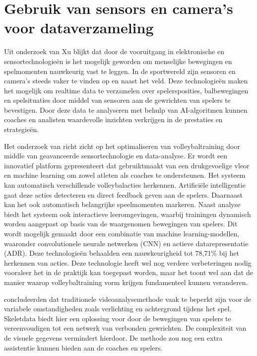 \section{Gebruik van sensors en camera's voor dataverzameling}
Uit onderzoek van Xu \textcite{Sun2021} blijkt dat door de vooruitgang in elektronische en sensortechnologieën is het mogelijk geworden om menselijke bewegingen en spelmomenten nauwkeurig vast te leggen. In de sportwereld zijn sensoren en camera's steeds vaker te vinden op en naast het veld. Deze technologieën maken het mogelijk om realtime data te verzamelen over spelersposities, balbewegingen en spelsituaties door middel van sensoren aan de gewrichten van spelers te bevestigen. Door deze data te analyseren met behulp van AI-algoritmen kunnen coaches en analisten waardevolle inzichten verkrijgen in de prestaties en strategieën.

Het onderzoek van \textcite{Salim2024} richt zicht op het optimaliseren van volleybaltraining door middle van geavanceerde sensortechnologie en data-analyse. Er wordt een innovatief platform gepresenteert dat gebruiktmaakt van een drukgevoelige vleor en machine learning om zowel atleten als coaches te ondersteunen. Het systeem kan automatisch verschillende volleybalacties herkennen. Artificiële intelligentie gaat deze acties detecteren en direct feedback geven aan de spelers. Daarnaast kan het ook automatisch belangrijke speelmomenten markeren.
Naast analyse biedt het systeem ook interactieve leeromgevingen, waarbij trainingen dynamisch worden aangepast op basis van de waargenomen bewegingen van spelers. Dit wordt mogelijk gemaakt door een combinatie van machine learning-modellen, waaronder convolutionele neurale netwerken (CNN) en actieve datarepresentatie (ADR). Deze technologieën behaalden een nauwkeurigheid tot 78,71\% bij het herkennen van acties.
Deze technologie heeft wel nog verdere verbeteringen nodig vooraleer het in de praktijk kan toegepast worden, maar het toont wel aan dat de manier waarop volleybaltraining vorm krijgen fundamenteel kunnen veranderen.

\textcite{Liang2023} concludeerden dat traditionele videoanalysemethode vaak te beperkt zijn voor de variabele omstandigheden zoals verlichting en achtergrond tijdens het spel. Skeletdata biedt hier een oplossing voor door de bewegingen van spelers te vereenvoudigen tot een netwerk van verbonden gewrichten. De complexiteit van de visuele gegevens vermindert hierdoor. De methode zou nog een extra assistentie kunnen bieden aan de coaches en spelers.

